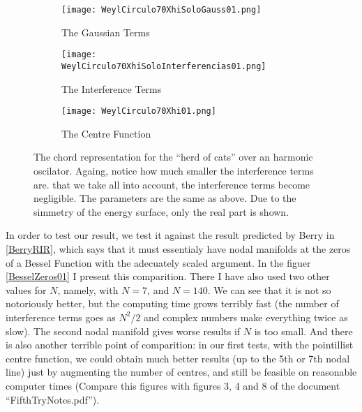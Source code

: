 \documentclass[a4paper,12pt]{article}
\begin{document}
\begin{figure}[H]
  \centering
  \begin{subfigure}[b]{0.33\textwidth}
    \centering
          \texttt{[image: WeylCirculo70XhiSoloGauss01.png]}
                \caption{The Gaussian Terms}
                \label{cuerdasgauss70}
  \end{subfigure}%
\begin{subfigure}[b]{0.33\textwidth}
    \centering
          \texttt{[image: WeylCirculo70XhiSoloInterferencias01.png]}
                \caption{The Interference Terms}
                \label{cuerdasinter70}
  \end{subfigure}
  \begin{subfigure}[b]{0.33\textwidth}
    \centering
          \texttt{[image: WeylCirculo70Xhi01.png]}
                \caption{The Centre Function}
                \label{cuerdasstodo70}
  \end{subfigure}%
\caption{ The chord representation for the ``herd of cats'' over an harmonic
oscilator. Againg, notice how much smaller the interference terms are.
that we take all into account, the interference terms become negligible.
The parameters are the same as above. Due to the simmetry of the
energy surface, only the real part is shown.
 }\label{weylcirculo70}
\end{figure}

In order to test our result, we test it against the result predicted
by Berry in \ref{BerryRIR}, which says that it must essentialy have
nodal manifolds at the zeros of a  Bessel Function with the adecuately
scaled argument. In the figuer \ref{BesselZeros01} I present this
comparition. There I have also used two other values for $N$, namely,
with $N=7$, and $N=140$. We can see that it is not so notoriously better,
but the computing time grows terribly fast (the number of interference
terms goes as $N^2/2$ and complex numbers make everything twice as slow).
The second nodal manifold gives worse results if $N$ is too small. 
And there is also another terrible point of comparition: in our first
tests, with the pointillist centre function, we could obtain much better
results (up to  the 5th or 7th nodal line) just by augmenting the number
of centres, and still be feasible on reasonable computer times
(Compare this figures with figures 3, 4 and 8 of the document ``FifthTryNotes.pdf''). 
\end{document}
